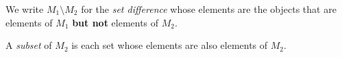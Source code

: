 \begin{Definition}
  We write $M_1\setminus M_2$ 
  for the \emph{set difference}
  whose elements are the objects
  that are elements of $M_1$ \textbf{but not} elements of $M_2$.

  A \emph{subset} of $M_2$
  is each set whose elements are also elements of $M_2$.


\end{Definition}
